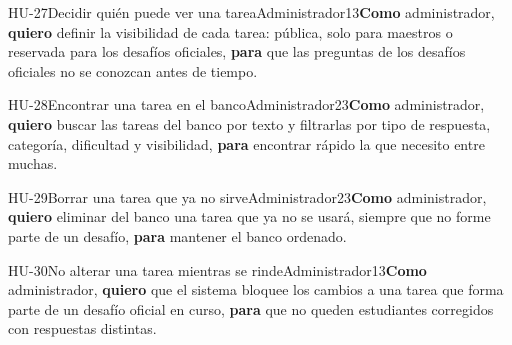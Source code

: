 \begin{historia}[1]{HU-27}{Decidir quién puede ver una tarea}{Administrador}{1}{3}{\textbf{Como} administrador, \textbf{quiero} definir la visibilidad de cada tarea: pública, solo para maestros o reservada para los desafíos oficiales, \textbf{para} que las preguntas de los desafíos oficiales no se conozcan antes de tiempo.}
\end{historia}

\begin{historia}[1]{HU-28}{Encontrar una tarea en el banco}{Administrador}{2}{3}{\textbf{Como} administrador, \textbf{quiero} buscar las tareas del banco por texto y filtrarlas por tipo de respuesta, categoría, dificultad y visibilidad, \textbf{para} encontrar rápido la que necesito entre muchas.}
\end{historia}

\begin{historia}[1]{HU-29}{Borrar una tarea que ya no sirve}{Administrador}{2}{3}{\textbf{Como} administrador, \textbf{quiero} eliminar del banco una tarea que ya no se usará, siempre que no forme parte de un desafío, \textbf{para} mantener el banco ordenado.}
\end{historia}

\begin{historia}[1]{HU-30}{No alterar una tarea mientras se rinde}{Administrador}{1}{3}{\textbf{Como} administrador, \textbf{quiero} que el sistema bloquee los cambios a una tarea que forma parte de un desafío oficial en curso, \textbf{para} que no queden estudiantes corregidos con respuestas distintas.}
\end{historia}

